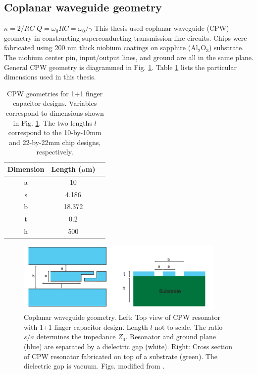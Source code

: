 \documentclass[11 pt, oneside]{book} %
\begin{document}
\subsection{Coplanar waveguide geometry}\label{sec:CPW}
$\kappa=2/RC$
$Q = \omega_0RC = \omega_0/\gamma$
This thesis used coplanar waveguide (CPW) geometry in constructing superconducting transmission line circuits. Chips were fabricated using 200 nm thick niobium coatings on sapphire ($\mathrm{Al_2O_3}$) substrate. The niobium center pin, input/output lines, and ground are all in the same plane. General CPW geometry is diagrammed in Fig. \ref{fig:CPW}. Table \ref{tab:CPW} lists the particular dimensions used in this thesis. 

\begin{table}[htb]
\centering
\begin{tabular}{|c|c|c|}
   \hline
   Dimension & Length ($\mu$m)\\
   \hline
   a & 10\\
   \hline
   s & 4.186\\
   \hline
   b & 18.372\\
   \hline
   t & 0.2\\
   \hline
   h & 500\\
   \hline
\end{tabular}
\caption[CPW geometries.]{CPW geometries for 1+1 finger capacitor designs. Variables correspond to dimensions shown in Fig. \ref{fig:CPW}. The two lengths $l$ correspond to the 10-by-10mm and 22-by-22mm chip designs, respectively. }
\label{tab:CPW}
\end{table} 

\begin{figure}[h] 
   \centering
   \includegraphics[width=4in]{SchusterCPW.png} 
   \caption[Coplanar waveguide geometry]{Coplanar waveguide geometry. Left: Top view of CPW resonator with 1+1 finger capacitor design. Length $l$ not to scale. The ratio $s/a$ determines the impedance $Z_0$. Resonator and ground plane (blue) are separated by a dielectric gap (white). Right: Cross section of CPW resonator fabricated on top of a substrate (green). The dielectric gap is vacuum. Figs. modified from \cite{Schuster}.}
   \label{fig:CPW}
\end{figure}
\end{document}
